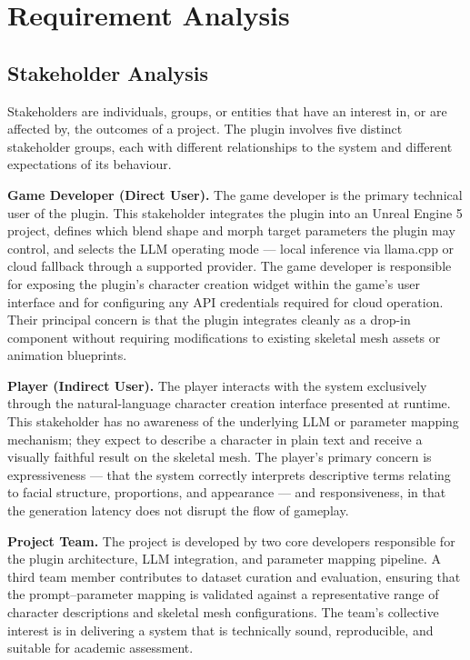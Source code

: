 \chapter{Requirement Analysis}
\label{chap:requirement-analysis}

\section{Stakeholder Analysis}
\label{section:stakeholder-analysis}

Stakeholders are individuals, groups, or entities that have an interest in, or
are affected by, the outcomes of a project. The plugin involves
five distinct stakeholder groups, each with different relationships to the
system and different expectations of its behaviour.

\textbf{Game Developer (Direct User).} The game developer is the primary
technical user of the plugin. This stakeholder integrates the plugin into an
Unreal Engine 5 project, defines which blend shape and morph target parameters
the plugin may control, and selects the LLM operating mode — local inference via
llama.cpp or cloud fallback through a supported provider. The game developer is
responsible for exposing the plugin's character creation widget within the game's
user interface and for configuring any API credentials required for cloud
operation. Their principal concern is that the plugin integrates cleanly as a
drop-in component without requiring modifications to existing skeletal mesh
assets or animation blueprints.

\textbf{Player (Indirect User).} The player interacts with the system
exclusively through the natural-language character creation interface presented
at runtime. This stakeholder has no awareness of the underlying LLM or parameter
mapping mechanism; they expect to describe a character in plain text and receive
a visually faithful result on the skeletal mesh. The player's primary concern is
expressiveness — that the system correctly interprets descriptive terms relating
to facial structure, proportions, and appearance — and responsiveness, in that
the generation latency does not disrupt the flow of gameplay.

\textbf{Project Team.} The project is developed by two core developers
responsible for the plugin architecture, LLM integration, and parameter mapping
pipeline. A third team member contributes to dataset curation and evaluation,
ensuring that the prompt--parameter mapping is validated against a representative
range of character descriptions and skeletal mesh configurations. The team's
collective interest is in delivering a system that is technically sound,
reproducible, and suitable for academic assessment.

